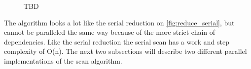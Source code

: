 \begin{figure}[ht]
	\centering
	\caption{TBD}
	\label{fig:scan_serial}
\end{figure}

The algorithm looks a lot like the serial reduction on \cref{fig:reduce_serial}, but cannot be paralleled the same way because of the more strict chain of dependencies. Like the serial reduction the serial scan has a work and step complexity of O(n). The next two subsections will describe two different parallel implementations of the scan algorithm.